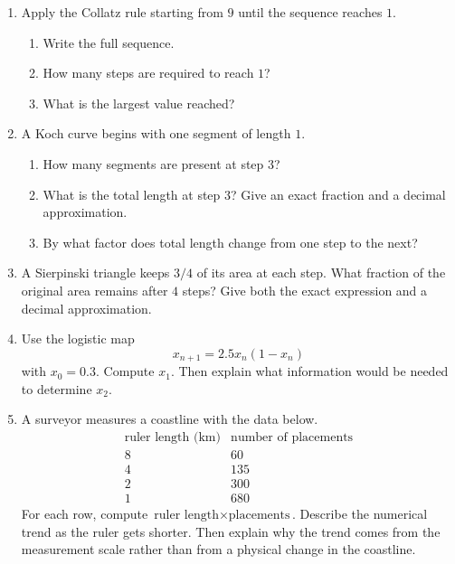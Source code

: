 \documentclass[11pt]{article}
\newcommand{\worklarge}{\par\vspace{0.92in}}
\newcommand{\workxl}{\par\vspace{1.22in}}
\begin{document}
\begin{enumerate}
\item Apply the Collatz rule starting from \(9\) until the sequence reaches \(1\).
\begin{enumerate}[label=(\alph*),itemsep=4pt]
\item Write the full sequence.
\item How many steps are required to reach \(1\)?
\item What is the largest value reached?
\end{enumerate}
\worklarge

\item A Koch curve begins with one segment of length \(1\).
\begin{enumerate}[label=(\alph*),itemsep=4pt]
\item How many segments are present at step \(3\)?
\item What is the total length at step \(3\)? Give an exact fraction and a decimal approximation.
\item By what factor does total length change from one step to the next?
\end{enumerate}
\worklarge

\item A Sierpinski triangle keeps \(3/4\) of its area at each step. What fraction of the original area remains after \(4\) steps? Give both the exact expression and a decimal approximation.
\worklarge

\item Use the logistic map
\[
x_{n+1}=2.5x_n(1-x_n)
\]
with \(x_0=0.3\). Compute \(x_1\). Then explain what information would be needed to determine \(x_2\).
\worklarge

\item A surveyor measures a coastline with the data below.
\[
\begin{array}{c|c}
\text{ruler length (km)} & \text{number of placements}\\\hline
8 & 60\\
4 & 135\\
2 & 300\\
1 & 680
\end{array}
\]
For each row, compute \(\text{ruler length}\times\text{placements}\). Describe the numerical trend as the ruler gets shorter. Then explain why the trend comes from the measurement scale rather than from a physical change in the coastline.
\workxl
\end{enumerate}
\end{document}
